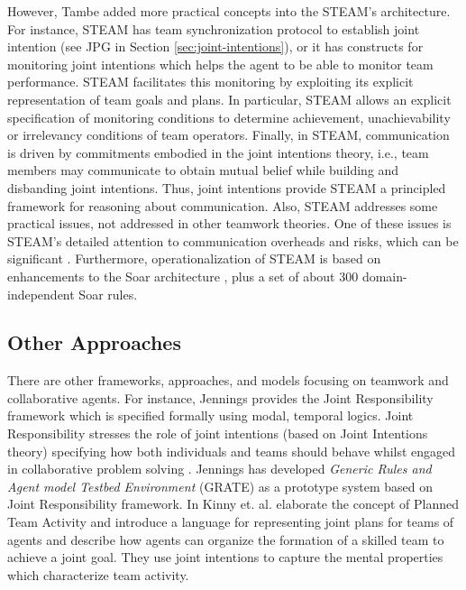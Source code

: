 \documentclass[11pt]{article}
\begin{document}
However, Tambe added more practical concepts into the STEAM's architecture. For
instance, STEAM has team synchronization protocol to establish joint intention
(see JPG in Section \ref{sec:joint-intentions}), or it has constructs for
monitoring joint intentions which helps the agent to be able to monitor team
performance. STEAM facilitates this monitoring by exploiting its explicit
representation of team goals and plans. In particular, STEAM allows an explicit
specification of monitoring conditions to determine achievement, unachievability
or irrelevancy conditions of team operators. Finally, in STEAM, communication is
driven by commitments embodied in the joint intentions theory, i.e., team
members may communicate to obtain mutual belief while building and disbanding
joint intentions. Thus, joint intentions provide STEAM a principled framework
for reasoning about communication. Also, STEAM addresses some practical issues,
not addressed in other teamwork theories. One of these issues is STEAM's
detailed attention to communication overheads and risks, which can be
significant \cite{tambe:agent-archtecture-teamwork}. Furthermore,
operationalization of STEAM is based on enhancements to the Soar architecture
\cite{laird:soar}, plus a set of about 300 domain-independent Soar rules.

\subsection{Other Approaches}

There are other frameworks, approaches, and models focusing on teamwork and
collaborative agents. For instance, Jennings provides the Joint Responsibility
framework which is specified formally using modal, temporal logics. Joint
Responsibility stresses the role of joint intentions (based on Joint Intentions
theory) specifying how both individuals and teams should behave whilst engaged
in collaborative problem solving \cite{jennings:joint-responsibility,
jennings:on-responsible, jennings:joint-intention-hybrid,
jennings:joint-responsibility-dynamic}. Jennings has developed \textit{Generic
Rules and Agent model Testbed Environment} (GRATE) as a prototype system based
on Joint Responsibility framework. In \cite{kinny:planned-team} Kinny et.
al. elaborate the concept of Planned Team Activity and introduce a language for
representing joint plans for teams of agents and describe how agents can
organize the formation of a skilled team to achieve a joint goal. They use joint
intentions to capture the mental properties which characterize team activity.
\end{document}

